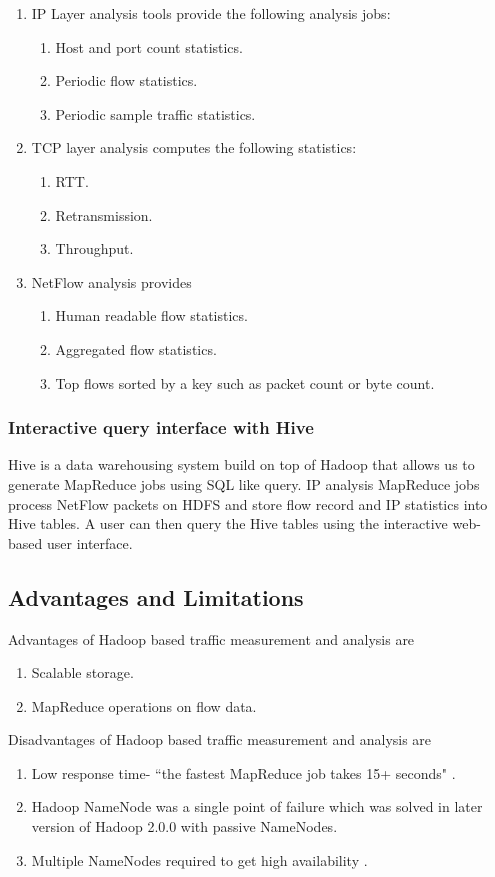 	\begin{enumerate}
	 \item IP Layer analysis tools provide the following analysis jobs:
	      \begin{enumerate}
	       \item Host and port count statistics.
	       \item Periodic flow statistics.
	       \item Periodic sample traffic statistics.
	      \end{enumerate}
	 \item TCP layer analysis computes the following statistics:
	       \begin{enumerate}
	        \item RTT.
	        \item Retransmission.
	        \item Throughput.
	       \end{enumerate}
	\item NetFlow analysis provides 
	      \begin{enumerate}
	       \item Human readable flow statistics.
	       \item Aggregated flow statistics.
	       \item Top flows sorted by a key such as packet count or byte count. 
	      \end{enumerate}
	\end{enumerate}

      \subsubsection{Interactive query interface with Hive}
      Hive is a data warehousing system build on top of Hadoop that allows us to generate MapReduce jobs using SQL like query.
      IP analysis MapReduce jobs process NetFlow packets on HDFS and  store flow record and IP statistics into
      Hive tables. A user can then query the Hive tables using the interactive web-based user interface.
      
      \subsection{Advantages and Limitations}
      Advantages of Hadoop based traffic  measurement and analysis are 
	\begin{enumerate}
	  \item Scalable storage.
	  \item MapReduce operations on flow data.
	\end{enumerate}
      Disadvantages of Hadoop based traffic  measurement and analysis are
	\begin{enumerate}
	 \item Low response time- ``the fastest MapReduce job takes 15+ seconds" \cite{ha}.
	 \item Hadoop NameNode was a single point of failure which was solved in later version of 
	        Hadoop 2.0.0 with passive NameNodes.
	 \item Multiple NameNodes required to get high availability \cite{ha}.
	\end{enumerate}

